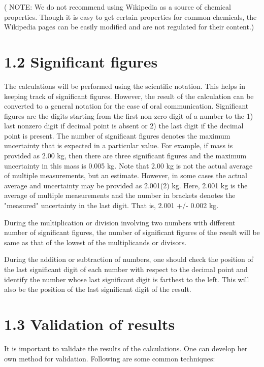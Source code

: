 \documentclass[journal=jpcbfk,manuscript=article]{achemso}
\begin{document}
( NOTE: We do not recommend using Wikipedia as a source of chemical properties. Though it is easy to get certain properties for common chemicals, the Wikipedia pages can be easily modified and are not regulated for their content.)

\section{1.2 Significant figures}

The calculations will be performed using the scientific notation. This helps in keeping track of significant figures. However, the result of the calculation can be converted to a general notation for the ease of oral communication. Significant figures are the digits starting from the first non-zero digit of a number to the 1) last nonzero digit if decimal point is absent or 2) the last digit if the decimal point is present.  The number of significant figures denotes the maximum uncertainty that is expected in a particular value. For example, if mass is provided as 2.00 kg, then there are three significant figures and the maximum uncertainty in this mass is 0.005 kg. Note that 2.00 kg is not the actual average of multiple measurements, but an estimate. However, in some cases the actual average and uncertainty may be provided as 2.001(2) kg. Here, 2.001 kg is the average of multiple measurements and the number in brackets denotes the "measured" uncertainty in the last digit. That is, 2.001 +/- 0.002 kg.

During the multiplication or division involving two numbers with different number of significant figures, the number of significant figures of the result will be same as that of the lowest of the multiplicands or divisors.

During the addition or subtraction of numbers, one should check the position of the last significant digit of each number with respect to the decimal point and identify the number whose last significant digit is farthest to the left. This will also be the position of the last significant digit of the result.

\section{1.3 Validation of results}

It is important to validate the results of the calculations. One can develop her own method for validation. Following are some common techniques:
\end{document}
